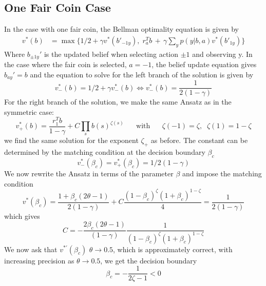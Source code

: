 \documentclass[aps,nofootinbib,groupaddress,superscriptaddress,reprint,amsmath,amssymb,graphicx,onecolumn,prx]{revtex4-2}
\begin{document}
\subsection*{One Fair Coin Case}
\noindent In the case with one fair coin, the Bellman optimality equation is given by
\begin{align}
    v^*(b)&=\max\Biggl\{1/2+\gamma v^*(b'_{-1y}),\;r_a^Tb\,+\,\gamma  \sum_yp(y|b,a)v^*(b'_{1y})\Biggr\}
\end{align}
Where $b_{\pm1y}'$ is the updated belief when selecting action $\pm1$ and observing y. In the case where the fair coin is selected, $a=-1$, the belief update equation gives $b_{ay}'=b$ and the equation to solve for the left branch of the solution is given by
\begin{equation}
    v_-^*(b)=1/2+\gamma v^*_-(b)\iff v_-^*(b)=\frac{1}{2(1-\gamma)}
\end{equation}
For the right branch of the solution, we make the same Ansatz
as in the symmetric case:
\begin{equation}
    v_+^*(b)=\frac{r_{1}^Tb}{1-\gamma}+C\prod_s b(s)^{\zeta(s)} \;\;\;\;\;\;\text{with}\;\;\;\;\;\; \zeta(-1)=\zeta,\;\;\zeta(1)=1-\zeta
\end{equation}
we find the same solution for the exponent $\zeta_+$ as before. The constant can be determined by the matching condition at the decision boundary $\beta_c$
\begin{equation}
    v_-^*(\beta_c)=v_+^*(\beta_c)=1/2(1-\gamma)
\end{equation}
We now rewrite the Ansatz in terms of the parameter $\beta$ and impose the matching condition
\begin{equation}
    v^*(\beta_c)=\frac{1+\beta_c(2\theta-1)}{2(1-\gamma)}+C\frac{(1-\beta_c)^{\zeta}(1+\beta_c)^{1-\zeta}}{4}=\frac{1}{2(1-\gamma)}
\end{equation}
which gives
\begin{equation}
    C=-\frac{2\beta_c(2\theta-1)}{(1-\gamma)}\frac{1}{(1-\beta_c)^{\zeta}(1+\beta_c)^{1-\zeta}}
\end{equation}
We now ask that $v^{*'}(\beta_c)$ $\theta\to0.5$, which is approximately correct, with increasing precision as $\theta\to0.5$, we get the decision boundary
\begin{equation}
    \beta_c=-\frac{1}{2\zeta-1}<0
\end{equation}


\newpage
\end{document}
